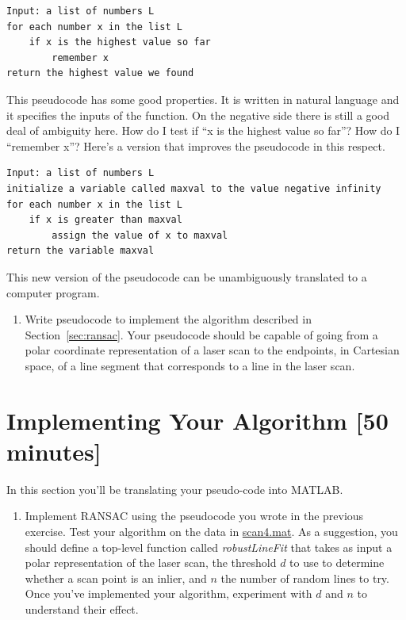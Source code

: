 \documentclass{tufte-handout}
\begin{document}
\begin{enumerate}
\begin{verbatim}
Input: a list of numbers L
for each number x in the list L
    if x is the highest value so far
        remember x
return the highest value we found
\end{verbatim}
This pseudocode has some good properties.  It is written in natural language and it specifies the inputs of the function.  On the negative side there is still a good deal of ambiguity here.  How do I test if ``x is the highest value so far''?  How do I ``remember x''?  Here's a version that improves the pseudocode in this respect.

\begin{verbatim}
Input: a list of numbers L
initialize a variable called maxval to the value negative infinity
for each number x in the list L
    if x is greater than maxval
        assign the value of x to maxval
return the variable maxval
\end{verbatim}

This new version of the pseudocode can be unambiguously translated to a computer program.

\end{enumerate}

\begin{enumerate}[series=exercises, label=\textbf{Exercise} (\arabic*)]
\item Write pseudocode to implement the algorithm described in Section~\ref{sec:ransac}.  Your pseudocode should be capable of going from a polar coordinate representation of a laser scan to the endpoints, in Cartesian space, of a line segment that corresponds to a line in the laser scan.
\end{enumerate}

\section{Implementing Your Algorithm [50 minutes]}

In this section you'll be translating your pseudo-code into MATLAB.

\begin{enumerate}[resume=exercises, label=\textbf{Exercise} (\arabic*)]
\item Implement RANSAC using the pseudocode you wrote in the previous exercise.  Test your algorithm on the data in \href{https://canvas.instructure.com/courses/1096977/files/50482786/download?wrap=1}{scan4.mat}.  As a suggestion, you should define a top-level function called \emph{robustLineFit} that takes as input a polar representation of the laser scan, the threshold $d$ to use to determine whether a scan point is an inlier, and $n$ the number of random lines to try.  Once you've implemented your algorithm, experiment with $d$ and $n$ to understand their effect.
\end{enumerate}
\end{document}
